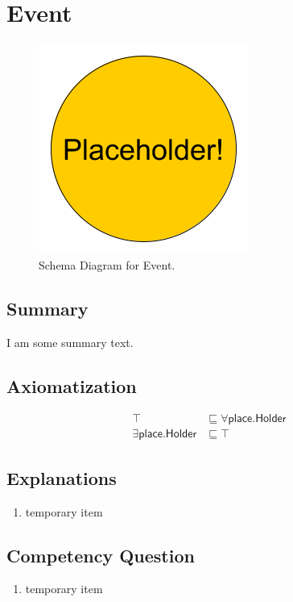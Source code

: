 \section{Event}
\label{sec:Event}
\begin{figure}[h!]
\begin{center}
\includegraphics[width=.4\textwidth]{figures/placeholder}
\end{center}
\caption{Schema Diagram for Event.}
\label{fig:Event}
\end{figure}
\subsection{Summary}
\label{sum:Event}
I am some summary text.

\subsection{Axiomatization}
\label{axs:Event}
\begin{align}
\top &\sqsubseteq \forall\textsf{place.Holder} \\ 
\exists\textsf{place.Holder} &\sqsubseteq \top 
\end{align}

\subsection{Explanations}
\label{exp:Event}
\begin{enumerate}
\item temporary item
\end{enumerate}

\subsection{Competency Question}
\label{cqs:Event}
\begin{enumerate}[CQ1.]
\item temporary item
\end{enumerate}

\newpage
